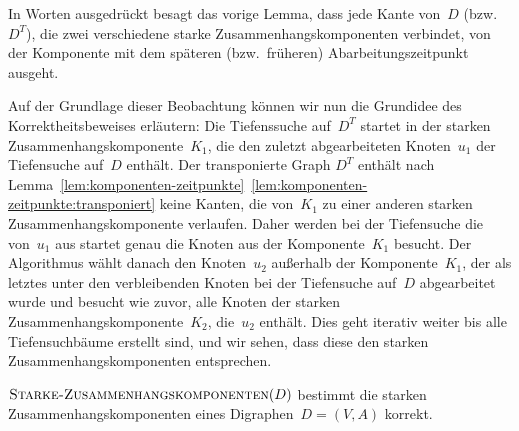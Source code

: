 \begin{bem} 
In Worten ausgedrückt besagt das vorige Lemma, dass jede Kante von~$D$ (bzw.~$D^T$), die zwei verschiedene starke Zusammenhangskomponenten verbindet, von der Komponente mit dem späteren (bzw.~früheren) Abarbeitungszeitpunkt ausgeht.

Auf der Grundlage dieser Beobachtung können wir nun die Grundidee des Korrektheitsbeweises erläutern:
Die Tiefenssuche auf~$D^T$ startet in der starken Zusammenhangskomponente~$K_1$, die den zuletzt abgearbeiteten Knoten~$u_1$ der Tiefensuche auf~$D$ enthält.
Der transponierte Graph $D^T$ enthält nach Lemma~\ref{lem:komponenten-zeitpunkte}~\ref{lem:komponenten-zeitpunkte:transponiert} keine Kanten, die von~$K_1$ zu einer anderen starken Zusammenhangskomponente verlaufen.
Daher werden bei der Tiefensuche die von~$u_1$ aus startet genau die Knoten aus der Komponente~$K_1$ besucht.
Der Algorithmus wählt danach den Knoten~$u_2$ außerhalb der Komponente~$K_1$, der als letztes unter den verbleibenden Knoten bei der Tiefensuche auf~$D$ abgearbeitet wurde und besucht wie zuvor, alle Knoten der starken Zusammenhangskomponente~$K_2$, die~$u_2$ enthält.
Dies geht iterativ weiter bis alle Tiefensuchbäume erstellt sind, und wir sehen, dass diese den starken Zusammenhangskomponenten entsprechen.
\end{bem} 

\begin{thm}
$\mathop{\text{\textsc{Starke-Zusammenhangskomponenten}}}(D)$ bestimmt die starken Zusammenhangskomponenten eines Digraphen~$D=(V,A)$ korrekt.
\end{thm}

